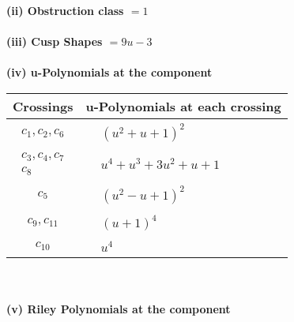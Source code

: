 \documentclass[1p]{elsarticle_modified}
\theoremstyle{definition}
\begin{document}
\flushleft \textbf{(ii) Obstruction class $= 1$}\\~\\
\flushleft \textbf{(iii) Cusp Shapes $= 9 u-3$}\\~\\
\newpage\renewcommand{\arraystretch}{1}
\flushleft \textbf{(iv) u-Polynomials at the component}\newline \\
\begin{tabular}{m{50pt}|m{274pt}}
Crossings & \hspace{64pt}u-Polynomials at each crossing \\
\hline $$\begin{aligned}c_{1},c_{2},c_{6}\end{aligned}$$&$\begin{aligned}
&(u^2+u+1)^2
\end{aligned}$\\
\hline $$\begin{aligned}c_{3},c_{4},c_{7}\\c_{8}\end{aligned}$$&$\begin{aligned}
&u^4+u^3+3 u^2+u+1
\end{aligned}$\\
\hline $$\begin{aligned}c_{5}\end{aligned}$$&$\begin{aligned}
&(u^2- u+1)^2
\end{aligned}$\\
\hline $$\begin{aligned}c_{9},c_{11}\end{aligned}$$&$\begin{aligned}
&(u+1)^4
\end{aligned}$\\
\hline $$\begin{aligned}c_{10}\end{aligned}$$&$\begin{aligned}
&u^4
\end{aligned}$\\
\hline
\end{tabular}\\~\\
\newpage\renewcommand{\arraystretch}{1}
\flushleft \textbf{(v) Riley Polynomials at the component}\newline \\
\end{document}
